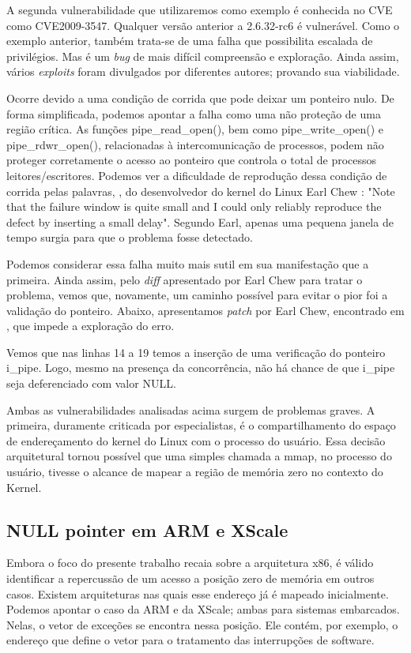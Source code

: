 			
			A segunda vulnerabilidade que utilizaremos como exemplo é conhecida no CVE como CVE2009-3547.
			Qualquer versão anterior a 2.6.32-rc6 é vulnerável.
			Como o exemplo anterior, também trata-se de uma falha que possibilita escalada de privilégios.
			Mas é um \textsl{bug} de mais difícil compreensão e exploração. Ainda assim, vários \textsl{exploits}
			foram divulgados por diferentes autores; provando sua viabilidade.

			
			Ocorre devido a uma condição de corrida que pode deixar	um ponteiro nulo. De forma simplificada,
			podemos apontar a falha como uma não proteção de uma região crítica. As funções
			pipe\_read\_open(), bem como pipe\_write\_open() e pipe\_rdwr\_open(), relacionadas à intercomunicação
			de processos, podem não proteger corretamente o acesso ao ponteiro que controla o total de
			processos leitores/escritores. Podemos ver a dificuldade de reprodução dessa condição de corrida pelas
			palavras, \cite{git_kernel_org_cve2009_3547}, do desenvolvedor do kernel do Linux Earl Chew :
			"Note that the failure window is quite small and I could only
			reliably reproduce the defect by inserting a small delay".
			Segundo Earl, apenas uma pequena janela de tempo surgia para que o problema fosse detectado.
			
	
			Podemos considerar essa falha muito mais sutil em sua manifestação que a primeira.
			Ainda assim, pelo \textsl{diff} apresentado por Earl Chew para tratar o problema,
			vemos que, novamente, um caminho possível para evitar o pior foi a validação do ponteiro.
			Abaixo, apresentamos \textsl{patch} por Earl Chew, encontrado em \cite{git_kernel_org_cve2009_3547}, 
			que impede a exploração do erro.
			
			Vemos que nas linhas 14 a 19 temos a inserção de uma verificação do ponteiro i\_pipe.
			Logo, mesmo na presença da concorrência, não há chance de que i\_pipe seja deferenciado com valor NULL.
			
			
			Ambas as vulnerabilidades analisadas acima surgem de problemas graves.
			A primeira, duramente criticada por especialistas, é o compartilhamento do espaço de endereçamento
			do kernel do Linux com o processo do usuário. Essa decisão arquitetural
			tornou possível que uma simples chamada a mmap, no processo do usuário, tivesse o alcance de
			mapear a região de memória zero no contexto do Kernel. 
		

		\subsection{NULL pointer em ARM e XScale}
		\label{subsec:null_pointer_arm_xscale}
			Embora o foco do presente trabalho recaia sobre a arquitetura x86, é válido 
			identificar a repercussão de um acesso a posição zero de memória em outros casos.
			Existem arquiteturas nas quais esse endereço já é mapeado inicialmente. 
			Podemos apontar o caso da ARM e da XScale; ambas para sistemas embarcados. 
			Nelas, o vetor de exceções se encontra nessa posição. Ele contém, por exemplo,
			o endereço que define o vetor para o tratamento das interrupções de software.


